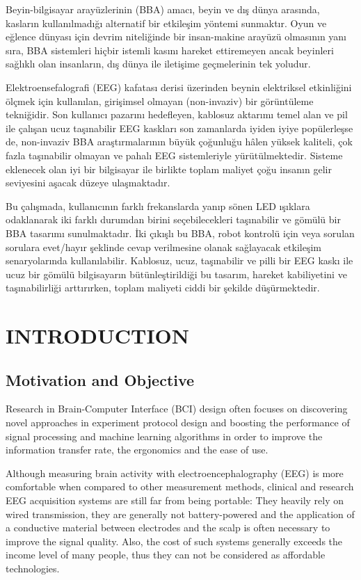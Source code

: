 \documentclass[12pt]{article}
\newcommand\mysection[1]{\vspace*{-0.35cm}\section{#1}\vspace*{6pt}\thispagestyle{empty}}
\newcommand\mysubsection[1]{\subsection{#1}}
\numberwithin{equation}{section}
\numberwithin{figure}{section}
\numberwithin{table}{section}
\begin{document}
\par{
    Beyin-bilgisayar arayüzlerinin (BBA) amacı, beyin ve dış dünya arasında, kasların
    kullanılmadığı alternatif bir etkileşim yöntemi sunmaktır. Oyun ve eğlence dünyası için devrim niteliğinde
    bir insan-makine arayüzü olmasının yanı sıra, BBA sistemleri hiçbir istemli kasını
    hareket ettiremeyen ancak beyinleri sağlıklı olan insanların, dış dünya ile iletişime geçmelerinin
    tek yoludur.
}
\par{
    Elektroensefalografi (EEG) kafatası derisi üzerinden beynin elektriksel
    etkinliğini ölçmek için kullanılan, girişimsel olmayan (non-invaziv) bir
    görüntüleme tekniğidir. Son kullanıcı pazarını hedefleyen,
    kablosuz aktarımı temel alan ve pil ile çalışan ucuz taşınabilir EEG kaskları son
    zamanlarda iyiden iyiye popülerleşse de, non-invaziv BBA araştırmalarının
    büyük çoğunluğu hâlen yüksek kaliteli, çok fazla taşınabilir olmayan
    ve pahalı EEG sistemleriyle yürütülmektedir. Sisteme eklenecek olan
    iyi bir bilgisayar ile birlikte toplam maliyet çoğu insanın gelir seviyesini
    aşacak düzeye ulaşmaktadır.
}
\par{
    Bu çalışmada, kullanıcının farklı frekanslarda yanıp sönen LED ışıklara
    odaklanarak iki farklı durumdan birini seçebilecekleri taşınabilir ve gömülü
    bir BBA tasarımı sunulmaktadır. İki çıkışlı bu BBA, robot kontrolü için veya
    sorulan sorulara evet/hayır şeklinde cevap verilmesine olanak sağlayacak
    etkileşim senaryolarında kullanılabilir. Kablosuz, ucuz, taşınabilir ve pilli bir EEG
    kaskı ile ucuz bir gömülü bilgisayarın bütünleştirildiği bu tasarım,
    hareket kabiliyetini ve taşınabilirliği arttırırken, toplam maliyeti
    ciddi bir şekilde düşürmektedir.
}
\clearpage

\mysection{INTRODUCTION}
\thispagestyle{fancy}
\cfoot{}

\mysubsection{Motivation and Objective}
\par{
    Research in Brain-Computer Interface (BCI) design often focuses
    on discovering novel approaches in experiment protocol design and
    boosting the performance of signal processing and machine learning algorithms
    in order to improve the information transfer rate, the ergonomics and the
    ease of use.
}

\par{
    Although measuring brain activity with electroencephalography (EEG) is more
    comfortable when compared to other measurement methods, clinical and research
    EEG acquisition systems are still far from being portable: They heavily
    rely on wired transmission, they are generally not battery-powered and
    the application of a conductive material between electrodes and the scalp is
    often necessary to improve the signal quality. Also, the cost of such systems
    generally exceeds the income level of many people, thus they can not be
    considered as affordable technologies.
}
\end{document}

